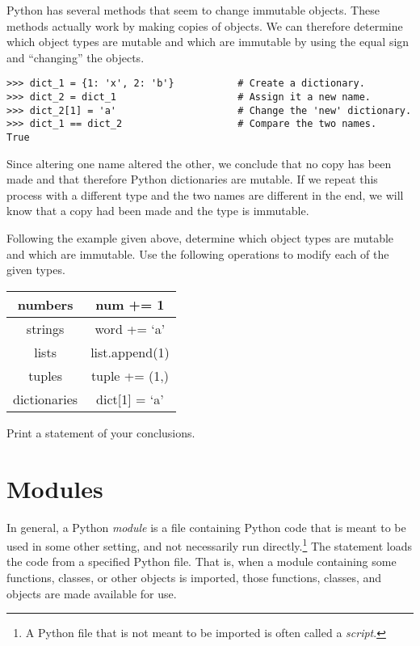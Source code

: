 \begin{problem} %
Python has several methods that seem to change immutable objects.
These methods actually work by making copies of objects.
We can therefore determine which object types are mutable and which are immutable by using the equal sign and ``changing'' the objects.

\begin{lstlisting}
>>> dict_1 = {1: 'x', 2: 'b'}           # Create a dictionary.
>>> dict_2 = dict_1                     # Assign it a new name.
>>> dict_2[1] = 'a'                     # Change the 'new' dictionary.
>>> dict_1 == dict_2                    # Compare the two names.
True
\end{lstlisting}

Since altering one name altered the other, we conclude that no copy has been made and that therefore Python dictionaries are mutable.
If we repeat this process with a different type and the two names are different in the end, we will know that a copy had been made and the type is immutable.

Following the example given above, determine which object types are mutable and which are immutable.
Use the following operations to modify each of the given types.

\begin{center}
\begin{tabular}{|c|c|}
\hline
numbers & num += 1 \\
\hline
strings & word += `a' \\
\hline
lists & list.append(1) \\
\hline
tuples & tuple += (1,) \\
\hline
dictionaries & dict[1] = `a' \\
\hline
\end{tabular}
\end{center}
Print a statement of your conclusions.
\end{problem}

\section*{Modules} %

In general, a Python \emph{module} is a file containing Python code that is meant to be used in some other setting, and not necessarily run directly.\footnote{A Python file that is not meant to be imported is often called a \emph{script}.}
The  statement loads the code from a specified Python file.
That is, when a module containing some functions, classes, or other objects is imported, those functions, classes, and objects are made available for use.

